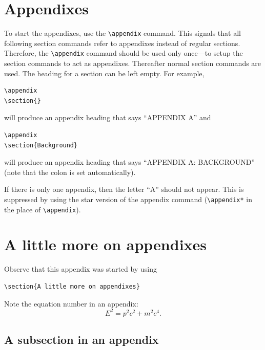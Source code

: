 \documentclass[]{article}
\begin{document}
\appendix

\section{Appendixes}

To start the appendixes, use the \verb+\appendix+ command. This signals that all following section commands refer to appendixes instead of regular sections. Therefore, the \verb+\appendix+ command should be used only once---to setup the section commands to act as appendixes. Thereafter normal section commands are used. The heading for a section can be left empty. For example, 
\begin{verbatim}
\appendix
\section{}
\end{verbatim}
will produce an appendix heading that says ``APPENDIX A'' and
\begin{verbatim}
\appendix
\section{Background}
\end{verbatim}
will produce an appendix heading that says ``APPENDIX A: BACKGROUND'' (note that the colon is set automatically).

If there is only one appendix, then the letter ``A'' should not appear. This is suppressed by using the star version of the appendix command (\verb+\appendix*+ in the place of \verb+\appendix+).

\section{A little more on appendixes}

Observe that this appendix was started by using
\begin{verbatim}
\section{A little more on appendixes}
\end{verbatim}

Note the equation number in an appendix:
\begin{equation}
  E^2=p^2c^2 + m^2c^4.
\end{equation}

\subsection{\label{app:subsec}A subsection in an appendix}
\end{document}
